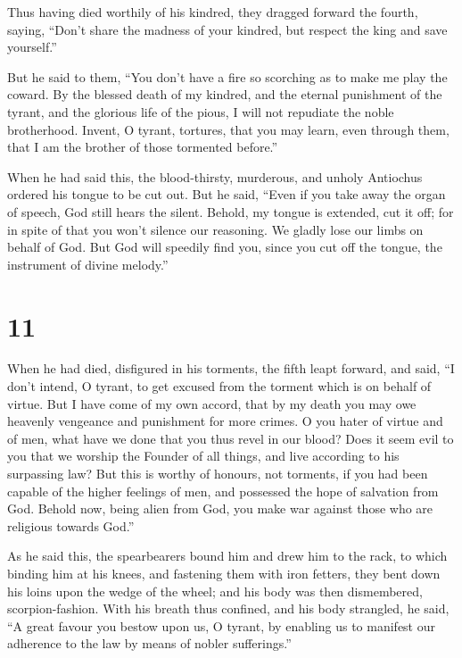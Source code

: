  Thus having died worthily of his kindred, they dragged
forward the fourth, saying,  ``Don't share the madness of
your kindred, but respect the king and save yourself.''

 But he said to them, ``You don't have a fire so scorching
as to make me play the coward.  By the blessed death of my
kindred, and the eternal punishment of the tyrant, and the glorious life
of the pious, I will not repudiate the noble brotherhood. 
Invent, O tyrant, tortures, that you may learn, even through them, that
I am the brother of those tormented before.''

 When he had said this, the blood-thirsty, murderous, and
unholy Antiochus ordered his tongue to be cut out.  But he
said, ``Even if you take away the organ of speech, God still hears the
silent.  Behold, my tongue is extended, cut it off; for in
spite of that you won't silence our reasoning.  We gladly
lose our limbs on behalf of God.  But God will speedily
find you, since you cut off the tongue, the instrument of divine
melody.''

\hypertarget{section-10}{%
\section{11}\label{section-10}}

 When he had died, disfigured in his torments, the fifth
leapt forward, and said,  ``I don't intend, O tyrant, to get
excused from the torment which is on behalf of virtue.  But
I have come of my own accord, that by my death you may owe heavenly
vengeance and punishment for more crimes.  O you hater of
virtue and of men, what have we done that you thus revel in our blood?
 Does it seem evil to you that we worship the Founder of all
things, and live according to his surpassing law?  But this
is worthy of honours, not torments,  if you had been capable
of the higher feelings of men, and possessed the hope of salvation from
God.  Behold now, being alien from God, you make war against
those who are religious towards God.''

 As he said this, the spearbearers bound him and drew him to
the rack,  to which binding him at his knees, and fastening
them with iron fetters, they bent down his loins upon the wedge of the
wheel; and his body was then dismembered, scorpion-fashion.
 With his breath thus confined, and his body strangled, he
said,  ``A great favour you bestow upon us, O tyrant, by
enabling us to manifest our adherence to the law by means of nobler
sufferings.''

